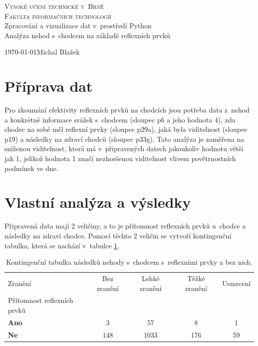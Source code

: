 \documentclass[a4paper, 11pt]{article}
\begin{document}
\begin{titlepage}
\begin{center}
    \Huge
    \textsc{Vysoké učení technické v~Brně\\
    \huge{Fakulta informačních technologií}}\\
    \LARGE{Zpracování a vizualizace dat v~prostředí Python}\\
    \Huge{Analýza nehod s~chodcem na základě reflexních prvků}\\
\end{center}
{\Large \today \hfill Michal Blažek}
\end{titlepage}

\section{Příprava dat}

Pro zkoumání efektivity reflexních prvků na chodcích jsou potřeba data z~nehod a konkrétně informace srážek s~chodcem (sloupec p6 a jeho hodnota 4), zda chodec na sobě měl reflexní prvky (sloupec p29a), jaká byla viditelnost (sloupec p19) a následky na zdraví chodců (sloupec p33g). Tato analýza je zaměřena na sníženou viditelnost, která má v~připravených datech jakoukoliv hodnotu větší jak 1, jelikož hodnota 1 značí nezhoršenou viditelnost vlivem povětrnostních podmínek ve dne.

\section{Vlastní analýza a výsledky}

Připravená data mají 2 veličiny, a to je přítomnost reflexních prvků u~chodce a následky na zdraví chodce. Pomocí těchto 2 veličin se vytvoří kontingenční tabulka, která se nachází v~tabulce \ref{tab:reflexni_prvky}.

\begin{table}[H]
    \centering
    \begin{tabular}{|l|c|c|c|c|}
        \toprule
        Zranění & Bez zranění & Lehké zranění & Těžké zranění & Usmrcení \\
        Přítomnost reflexních prvků &  &  &  &  \\
        \midrule
        \textbf{Ano} & 3 & 57 & 8 & 1 \\
        \textbf{Ne} & 148 & 1033 & 176 & 59 \\
        \bottomrule
    \end{tabular}
    \caption{Kontingenční tabulka následků nehody s~chodcem s~reflexními prvky a bez nich.}
    \label{tab:reflexni_prvky}
\end{table}
\end{document}

